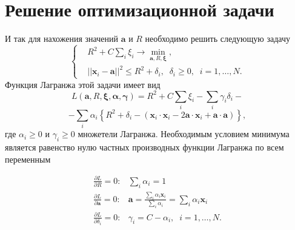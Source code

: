 \documentclass[12pt,a4paper]{amsart}
\newcommand\begcas[1]{\begin{cases}#1\end{cases}}
\newcommand\mb[1]{\ensuremath{\mathbf{#1}}}
\begin{document}
\section{Решение оптимизационной задачи}

И так для нахожения значений $\mb a$ и $R$ необходимо решить следующую задачу
\begin{equation}
			\begcas{
			&R^2 + C\sum\limits_{i}\xi_i \to \min\limits_{\mb a, R,\mb{\xi}}, \\
			&||\mb x_i-\mb a||^2\leq R^2 + \delta_i,\;\;\delta_i\geq0,\;\;i = 1,\ldots,N.
			} 
\end{equation}
Функция Лагранжа этой задачи имеет вид
$$L(\mb a, R,\mb{\xi},\mb{\alpha},\mb{\gamma})=R^2 + C\sum\limits_{i}\xi_i-\sum\limits_{i}\gamma_i\delta_i-$$
$$-\sum\limits_{i}\alpha_i\left\{R^2 + \delta_i-\left(\mb x_i\cdot\mb x_i-2\mb a\cdot\mb x_i+\mb a\cdot\mb a\right)\right\},$$
где $\alpha_i\geq 0$  и $\gamma_i\geq 0$ множетели Лагранжа.
Необходимым условием минимума является равенство нулю частных производных функции Лагранжа по всем переменным

\begin{equation}
\label{minLag}
\begin{array}{ll}
\frac{\partial L}{\partial R} = 0: & \sum\limits_{i} \alpha_i = 1\\
\frac{\partial L}{\partial \mb a} = 0: & \mb a = \frac{\sum\limits_{i}\alpha_i\mb x_i}{\sum\limits_{i} \alpha_i}= \sum\limits_{i} \alpha_i\mb x_i\\
\frac{\partial L}{\partial \delta_i} = 0: & \gamma_i = C - \alpha_i, \;\; i = 1,\ldots,N.\\
\end{array}
\end{equation}
\end{document}
